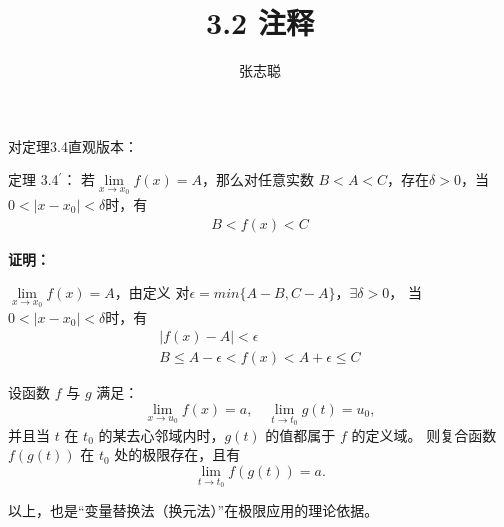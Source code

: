 \documentclass{article}
\begin{document}
\title{3.2 注释}
\author{张志聪}
\maketitle

\begin{zremark}
  对定理3.4直观版本：

  定理 3.4$^\prime$： 若$\lim\limits_{x \to x_0} f(x) = A$，那么对任意实数
  $B < A < C$，存在$\delta > 0$，当$0 < |x - x_0| < \delta$时，有
  \begin{align*}
    B < f(x) < C
  \end{align*}
\end{zremark}

\textbf{证明：}

$\lim\limits_{x \to x_0} f(x) = A$，由定义
对$\epsilon = min\{A - B, C - A\}$，$\exists \delta > 0$，
当$0 < |x - x_0| < \delta$时，有
\begin{align*}
  |f(x) - A| < \epsilon \\
  B \leq A - \epsilon < f(x) < A + \epsilon \leq C
\end{align*}

\begin{zremark}[复合函数极限定理]
  设函数 $f$ 与 $g$ 满足：
  \[
    \lim_{x \to u_0} f(x) = a, \quad \lim_{t \to t_0} g(t) = u_0,
  \]
  并且当 $t$ 在 $t_0$ 的某去心邻域内时，$g(t)$ 的值都属于 $f$ 的定义域。
  则复合函数 $f(g(t))$ 在 $t_0$ 处的极限存在，且有
  \[
    \lim_{t \to t_0} f(g(t)) = a.
  \]
\end{zremark}

以上，也是“变量替换法（换元法）”在极限应用的理论依据。
\end{document}
